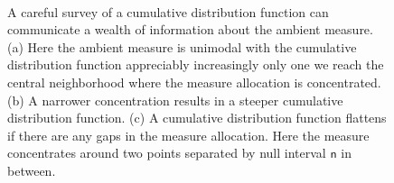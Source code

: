 \documentclass[
  letterpaper,
  DIV=11,
  numbers=noendperiod]{scrartcl}
\begin{document}
\begin{figure}
\begin{minipage}[t]{0.30\linewidth}
{{}

}

\subcaption{\label{fig-cdf-narrow-unimodal}}
\end{minipage}%
%
\begin{minipage}[t]{0.30\linewidth}

{\centering 


}

\subcaption{\label{fig-cdf-gap}}
\end{minipage}%
%
\begin{minipage}[t]{0.05\linewidth}

{\centering 

~

}

\end{minipage}%

\caption{\label{fig-hist-examples}A careful survey of a cumulative
distribution function can communicate a wealth of information about the
ambient measure. (a) Here the ambient measure is unimodal with the
cumulative distribution function appreciably increasingly only one we
reach the central neighborhood where the measure allocation is
concentrated. (b) A narrower concentration results in a steeper
cumulative distribution function. (c) A cumulative distribution function
flattens if there are any gaps in the measure allocation. Here the
measure concentrates around two points separated by null interval
\(\mathsf{n}\) in between.}

\end{figure}
\end{document}
